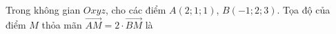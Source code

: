 \begin{ex}
Trong không gian $Oxyz$, cho các điểm $A(2;1;1)$, $B(-1;2;3)$. Tọa độ của điểm $M$ thỏa mãn $\overrightarrow{AM}=2\cdot\overrightarrow{BM}$ là
\end{ex}
